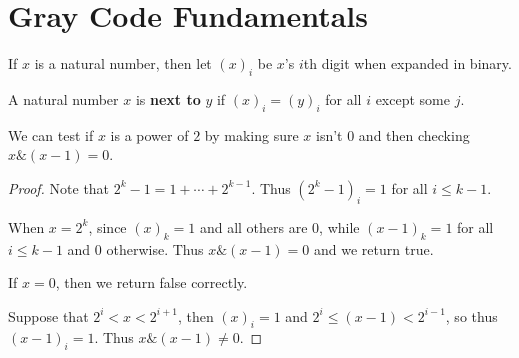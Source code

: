 %

\chapter{Gray Code Fundamentals}

\begin{definition}
    If $x$ is a natural number, then let $(x)_i$ be $x$'s $i$th digit when expanded in binary.
    \label{def:test_digit}
    \leanok
\end{definition}

\begin{definition}
    \label{def:next_to}
    \leanok
    A natural number $x$ is \textbf{next to} $y$ if $(x)_i = (y)_i$ for all $i$ except some $j$.
\end{definition}

\begin{theorem}
    \label{thm:bitwise_test_power_of_two}
    We can test if $x$ is a power of $2$ by making sure $x$ isn't 0 and then checking $x \& (x - 1) = 0$.
\end{theorem}

\begin{proof}
    Note that $2^k - 1 = 1 + \cdots + 2^{k-1}$. Thus $(2^k - 1)_i = 1$ for
    all $i \le {k-1}$.

    When $x = 2^k$, since $(x)_k = 1$ and all others are $0$, while $(x - 1)_k = 1$ for all $i \le k-1$ and $0$ otherwise. Thus $x \& (x - 1) = 0$ and we return true.

    If $x = 0$, then we return false correctly.
    
    Suppose that $2^i < x < 2^{i+1}$, then $(x)_i = 1$ and $2^i \le (x - 1) < 2^{i-1}$,
    so thus $(x-1)_i = 1$. Thus $x \& (x - 1) \neq 0$.
\end{proof}

